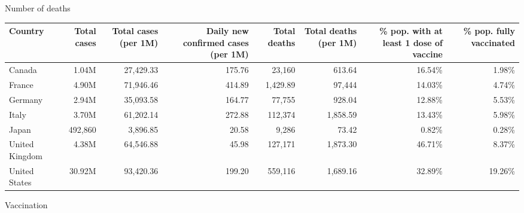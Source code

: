 \documentclass{beamer}
\begin{document}
%
%
\begin{frame}{Number of deaths}

	\begin{tabular}{lrrrrrrr}
    \toprule
    Country & Total cases & Total cases (per 1M) & Daily new confirmed cases (per 1M) & Total deaths & Total deaths (per 1M) & \% pop. with at least 1 dose of vaccine & \% pop. fully vaccinated \\
    \midrule
    Canada & 1.04M & 27,429.33 & 175.76 & 23,160 & 613.64 & 16.54\% & 1.98\% \\
    France & 4.90M & 71,946.46 & 414.89 & 1,429.89 & 97,444 & 14.03\% & 4.74\% \\
    Germany & 2.94M & 35,093.58 & 164.77 & 77,755 & 928.04 & 12.88\% & 5.53\% \\
    Italy & 3.70M & 61,202.14 & 272.88 & 112,374 & 1,858.59 & 13.43\% & 5.98\% \\
    Japan & 492,860 & 3,896.85 & 20.58 & 9,286 & 73.42 & 0.82\% & 0.28\% \\
    United Kingdom & 4.38M & 64,546.88 & 45.98 & 127,171 & 1,873.30 & 46.71\% & 8.37\% \\
    United States & 30.92M & 93,420.36 & 199.20 & 559,116 & 1,689.16 & 32.89\% & 19.26\% \\
    \bottomrule
	\end{tabular}
\end{frame}





%
%
\begin{frame}{Vaccination}

\end{frame}
\end{document}
